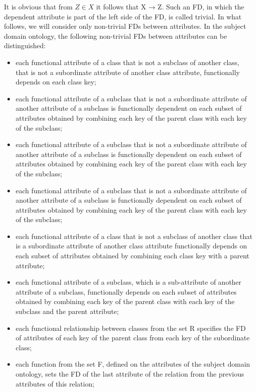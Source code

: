 \documentclass[10pt]{article}
\begin{document}
\begin{multicols}{2}
It is obvious that from $Z \in X$ it follows that X → Z.
Such an FD, in which the dependent attribute is part of
the left side of the FD, is called trivial. In what follows,
we will consider only non-trivial FDs between attributes.
In the subject domain ontology, the following non-trivial
FDs between attributes can be distinguished:
\begin{itemize}[left=10pt,labelsep=0pt,itemsep=-6pt,topsep=0pt]
    \item  each functional attribute of a class that is 
        not a subclass of another class, that is not a subordinate attribute of another class attribute, functionally depends on each class key;
    \item each functional attribute of a subclass that is not a subordinate attribute of another attribute of a subclass is functionally dependent on each subset of attributes obtained by combining each key of the parent class with each key of the subclass;
    \item  each functional attribute of a subclass that is not
a subordinate attribute of another attribute of a
subclass is functionally dependent on each subset
of attributes obtained by combining each key of the
parent class with each key of the subclass;
    \item each functional attribute of a subclass that is not
a subordinate attribute of another attribute of a
subclass is functionally dependent on each subset
of attributes obtained by combining each key of the
parent class with each key of the subclass;
    \item each functional attribute of a class that is not a subclass of another class that is a subordinate attribute
of another class attribute functionally depends on
each subset of attributes obtained by combining
each class key with a parent attribute;
\item each functional attribute of a subclass, which is
a sub-attribute of another attribute of a subclass,
functionally depends on each subset of attributes
obtained by combining each key of the parent class
with each key of the subclass and the parent attribute;
\item  each functional relationship between classes from
the set R specifies the FD of attributes of each key
of the parent class from each key of the subordinate
class;
\item  each function from the set F, defined on the attributes of the subject domain ontology, sets the FD
of the last attribute of the relation from the previous
attributes of this relation;

\end{itemize}
\end{multicols}
\end{document}
